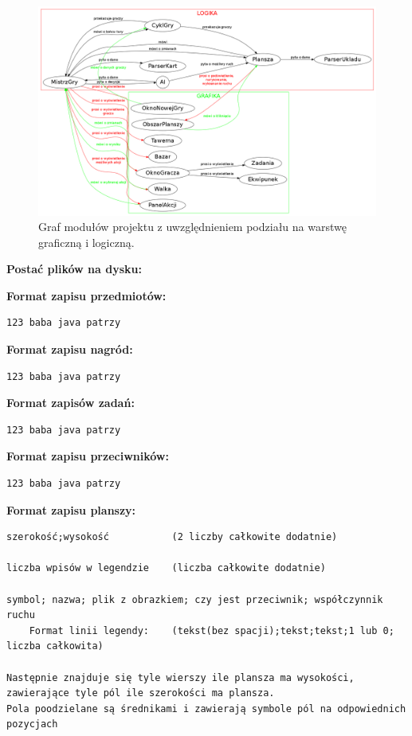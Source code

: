 \documentclass[a4paper, 11pt]{article}
\begin{document}
\newpage

\begin{figure}[ht]

\centering

\includegraphics[scale=0.24]{klasy.png}

\caption{Graf modułów projektu z uwzględnieniem podziału na warstwę graficzną i logiczną.} 

\label{Klasy}

\end{figure}

\noindent\textbf{Postać plików na dysku:}

\textbf{Format zapisu przedmiotów:}
\begin{verbatim}
123 baba java patrzy	
\end{verbatim}

\textbf{Format zapisu nagród:}
\begin{verbatim}
123 baba java patrzy	
\end{verbatim}

\textbf{Format zapisów zadań:}
\begin{verbatim}
123 baba java patrzy	
\end{verbatim}

\textbf{Format zapisu przeciwników:}
\begin{verbatim}
123 baba java patrzy	
\end{verbatim}

\newpage

\textbf{Format zapisu planszy:}
\begin{verbatim}
szerokość;wysokość           (2 liczby całkowite dodatnie)

liczba wpisów w legendzie    (liczba całkowite dodatnie)

symbol; nazwa; plik z obrazkiem; czy jest przeciwnik; współczynnik ruchu 
    Format linii legendy:    (tekst(bez spacji);tekst;tekst;1 lub 0; liczba całkowita)

Następnie znajduje się tyle wierszy ile plansza ma wysokości, 
zawierające tyle pól ile szerokości ma plansza.
Pola poodzielane są średnikami i zawierają symbole pól na odpowiednich pozycjach

\end{verbatim}
\end{document}
